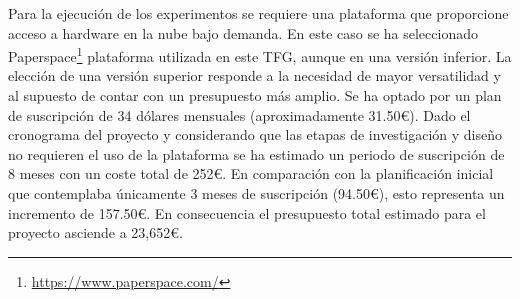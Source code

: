 Para la ejecución de los experimentos se requiere una plataforma que proporcione acceso a hardware en la nube bajo demanda. En este caso se ha seleccionado Paperspace\footnote{\url{https://www.paperspace.com/}} plataforma utilizada en este TFG, aunque en una versión inferior. La elección de una versión superior responde a la necesidad de mayor versatilidad y al supuesto de contar con un presupuesto más amplio. Se ha optado por un plan de suscripción de 34 dólares mensuales (aproximadamente 31.50€). Dado el cronograma del proyecto y considerando que las etapas de investigación y diseño no requieren el uso de la plataforma se ha estimado un periodo de suscripción de 8 meses con un coste total de 252€. En comparación con la planificación inicial que contemplaba únicamente 3 meses de suscripción (94.50€), esto representa un incremento de 157.50€. En consecuencia el presupuesto total estimado para el proyecto asciende a 23,652€.

